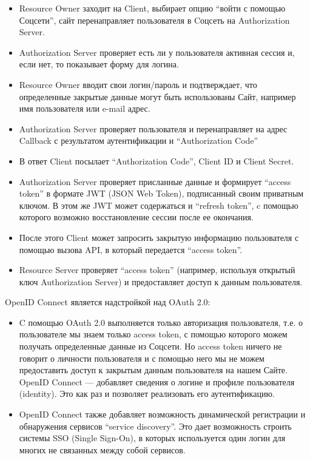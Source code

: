 \begin{itemize}
    \item Resource Owner заходит на Client, выбирает опцию “войти с помощью Соцсети”, сайт перенаправляет пользователя в Cоцсеть на Authorization Server.
    \item Authorization Server проверяет есть ли у пользователя активная сессия и, если нет, то показывает форму для логина.
    \item Resource Owner вводит свои логин/пароль и подтверждает, что определенные закрытые данные могут быть использованы Сайт, например имя пользователя или e-mail адрес.
    \item Authorization Server проверяет пользователя и перенаправляет на адрес Callback с результатом аутентификации и “Authorization Code”
    \item В ответ Client посылает “Authorization Code”, Client ID и Client Secret.
    \item Authorization Server проверяет присланные данные и формирует “access token” в формате JWT (JSON Web Token), подписанный своим приватным ключом. В этом же JWT может содержаться и “refresh token”, c помощью которого возможно восстановление сессии после ее окончания.
    \item После этого Client может запросить закрытую информацию пользователя с помощью вызова API, в который передается “access token”.
    \item Resource Server проверяет “access token” (например, используя открытый ключ Authorization Server) и предоставляет доступ к данным пользователя.\autocite{OAuthToken}
\end{itemize}

OpenID Connect является надстройкой над OAuth 2.0:

\begin{itemize}
    \item C помощью OAuth 2.0 выполняется только авторизация пользователя, т.е. о пользователе мы знаем только access token, с помощью которого можем получать определенные данные из Соцсети. Но access token ничего не говорит о личности пользователя и с помощью него мы не можем предоставить доступ к закрытым данным пользователя на нашем Сайте. OpenID Connect — добавляет сведения о логине и профиле пользователя (identity). Это как раз и позволяет реализовать его аутентификацию.
    \item OpenID Connect также добавляет возможность динамической регистрации и обнаружения сервисов “service discovery”. Это дает возможность строить системы SSO (Single Sign-On), в которых используется один логин для многих не связанных между собой сервисов.\autocite{OpenIDConnect}
\end{itemize}

